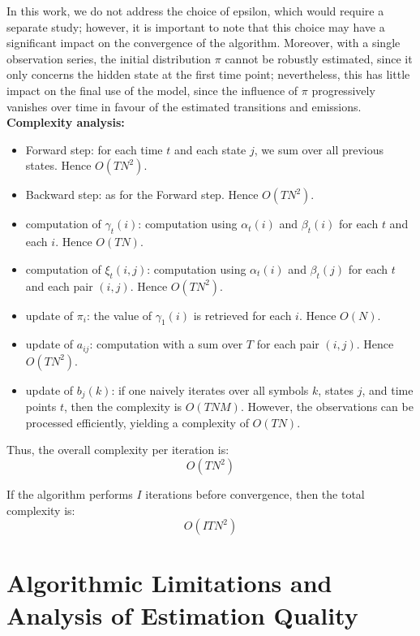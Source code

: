 \documentclass[11pt]{article}
\begin{document}
In this work, we do not address the choice of epsilon, which would require a separate study; however, it is important to note that this choice may have a significant impact on the convergence of the algorithm. Moreover, with a single observation series, the initial distribution \(\pi\) cannot be robustly estimated, since it only concerns the hidden state at the first time point; nevertheless, this has little impact on the final use of the model, since the influence of \(\pi\) progressively vanishes over time in favour of the estimated transitions and emissions.\\

\textbf{Complexity analysis:}
\begin{itemize}
    \item Forward step: for each time $t$ and each state $j$, we sum over all previous states. Hence $O(TN^2)$.
    \item Backward step: as for the Forward step. Hence $O(TN^2)$.
    \item computation of $\gamma_t(i)$: computation using $\alpha_t(i)$ and $\beta_t(i)$ for each $t$ and each $i$. Hence $O(TN)$.
    \item computation of $\xi_t(i,j)$: computation using $\alpha_t(i)$ and $\beta_t(j)$ for each $t$ and each pair $(i,j)$. Hence $O(TN^2)$.
    \item update of $\pi_i$: the value of $\gamma_1(i)$ is retrieved for each $i$. Hence $O(N)$.
    \item update of $a_{ij}$: computation with a sum over $T$ for each pair $(i,j)$. Hence $O(TN^2)$.
    \item update of $b_j(k)$: if one naively iterates over all symbols $k$, states $j$, and time points $t$, then the complexity is $O(TNM)$. However, the observations can be processed efficiently, yielding a complexity of $O(TN)$.
\end{itemize}

Thus, the overall complexity per iteration is:
\[
O(TN^2)
\]

If the algorithm performs $I$ iterations before convergence, then the total complexity is:
\[
O(ITN^2)
\]


\newpage
\section{Algorithmic Limitations and Analysis of Estimation Quality}
\end{document}
